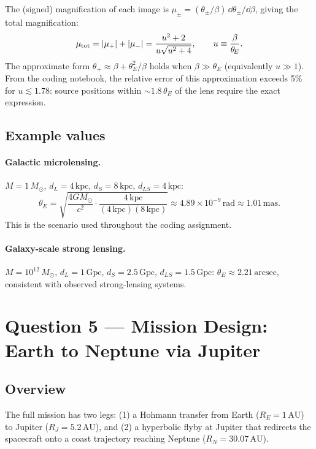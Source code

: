\documentclass[11pt, a4paper]{article}
\newcommand{\thetaE}{\theta_{\!E}}
\newcommand{\unit}[1]{\,\mathrm{#1}}
\begin{document}
The (signed) magnification of each image is $\mu_\pm = (\theta_\pm/\beta)\,\dd\theta_\pm/\dd\beta$,
giving the total magnification:
\begin{equation}
  \mu_{\rm tot} = |\mu_+| + |\mu_-|
               = \frac{u^2+2}{u\sqrt{u^2+4}}, \qquad u \equiv \frac{\beta}{\thetaE}.
  \label{eq:mu}
\end{equation}
The approximate form $\theta_+ \approx \beta + \thetaE^2/\beta$ holds when
$\beta \gg \thetaE$ (equivalently $u \gg 1$).  From the coding notebook, the
relative error of this approximation exceeds 5\% for $u \lesssim 1.78$: source
positions within $\sim 1.8\,\thetaE$ of the lens require the exact expression.

\subsection*{Example values}

\paragraph{Galactic microlensing.}
$M = 1\,M_\odot$, $d_L = 4\unit{kpc}$, $d_S = 8\unit{kpc}$, $d_{LS} = 4\unit{kpc}$:
\[
  \thetaE = \sqrt{\frac{4G M_\odot}{c^2}
            \cdot\frac{4\unit{kpc}}{(4\unit{kpc})(8\unit{kpc})}}
          \approx 4.89 \times 10^{-9}\unit{rad} \approx 1.01\unit{mas.}
\]
This is the scenario used throughout the coding assignment.

\paragraph{Galaxy-scale strong lensing.}
$M = 10^{12}\,M_\odot$, $d_L = 1\unit{Gpc}$, $d_S = 2.5\unit{Gpc}$,
$d_{LS} = 1.5\unit{Gpc}$: $\thetaE \approx 2.21\unit{arcsec}$,
consistent with observed strong-lensing systems.

\section{Question 5 — Mission Design: Earth to Neptune via Jupiter}
\label{sec:q5}

\subsection*{Overview}

The full mission has two legs: (1) a Hohmann transfer from Earth ($R_E = 1\unit{AU}$)
to Jupiter ($R_J = 5.2\unit{AU}$), and (2) a hyperbolic flyby at Jupiter that redirects
the spacecraft onto a coast trajectory reaching Neptune ($R_N = 30.07\unit{AU}$).
\end{document}
